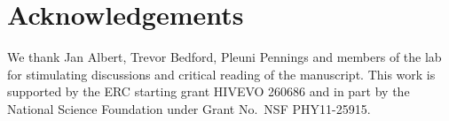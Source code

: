 \documentclass[rmp, twocolumn]{revtex4}
\begin{document}
\section*{Acknowledgements}
We thank Jan Albert, Trevor Bedford, Pleuni Pennings and members of the lab for 
stimulating discussions and critical reading of the manuscript.
This work is supported by the ERC starting grant HIVEVO 260686 and 
in part by the National Science Foundation under Grant No.~NSF PHY11-25915.



\newpage
\appendix
\onecolumngrid
\setcounter{figure}{0}

\end{document}
